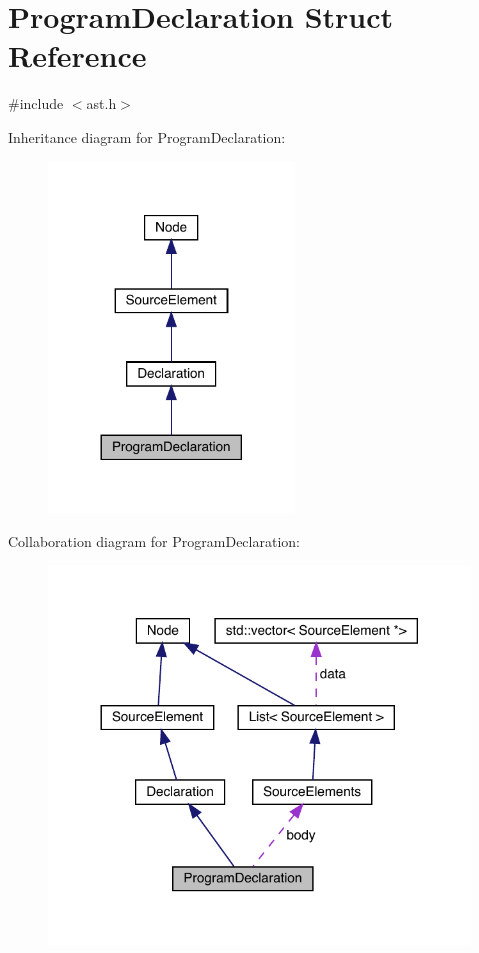 \hypertarget{struct_program_declaration}{}\section{Program\+Declaration Struct Reference}
\label{struct_program_declaration}


{\ttfamily \#include $<$ast.\+h$>$}



Inheritance diagram for Program\+Declaration\+:
\nopagebreak
\begin{figure}[H]
\begin{center}
\leavevmode
\includegraphics[width=185pt]{struct_program_declaration__inherit__graph}
\end{center}
\end{figure}


Collaboration diagram for Program\+Declaration\+:
\nopagebreak
\begin{figure}[H]
\begin{center}
\leavevmode
\includegraphics[width=317pt]{struct_program_declaration__coll__graph}
\end{center}
\end{figure}
